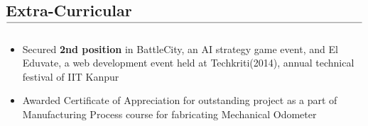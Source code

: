\documentclass[10pt,letterpaper]{article}
\newcommand\tline[2]{$\underset{\text{#1}}{\text{\underline{\hspace{#2}}}}$}
\begin{document}
\vspace{-1.8em}
\subsection*{Extra-Curricular\tline{}{5.65in}}
\vspace{-0.75em}

\begin{itemize}
	\setlength{\itemsep}{3pt}
		\item Secured \textbf{2nd position} in BattleCity, an AI strategy game event, and El Eduvate, a web development event held at Techkriti(2014), annual technical festival of IIT Kanpur
\item Awarded Certificate of Appreciation for outstanding project as a part of Manufacturing Process course for
fabricating Mechanical Odometer
		
		
	\end{itemize}
\end{document}
